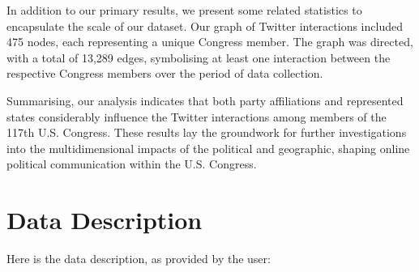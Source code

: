 \documentclass[11pt]{article}
\begin{document}
In addition to our primary results, we present some related statistics to encapsulate the scale of our dataset. Our graph of Twitter interactions included 475 nodes, each representing a unique Congress member. The graph was directed, with a total of 13,289 edges, symbolising at least one interaction between the respective Congress members over the period of data collection. 

Summarising, our analysis indicates that both party affiliations and represented states considerably influence the Twitter interactions among members of the 117th U.S. Congress. These results lay the groundwork for further investigations into the multidimensional impacts of the political and geographic, shaping online political communication within the U.S. Congress.


\clearpage
\appendix

\section{Data Description} \label{sec:data_description} Here is the data description, as provided by the user:
\end{document}
